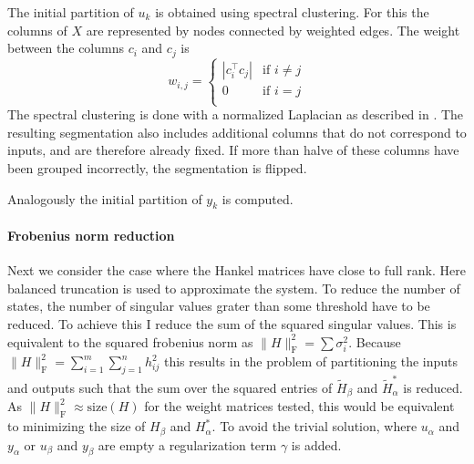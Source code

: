 \documentclass[doctype=mastersthesis,BCOR=15mm,biblatex]{ldvbook}%
\begin{document}
The initial partition of $u_k$ is obtained using spectral clustering.
For this the columns of $X$ are represented by nodes connected by weighted edges.
The weight between the columns $c_i$ and $c_j$ is  
\begin{equation}
	w_{i,j}=
	\begin{cases}
	|c_i^\top c_j| & \text{if } i\neq j\\
	0  & \text{if } i=j\\
	\end{cases}
\end{equation}
The spectral clustering is done with a normalized Laplacian as described in \cite{higham_spectral_2007}.
The resulting segmentation also includes additional columns that do not correspond to inputs, and are therefore already fixed.
If more than halve of these columns have been grouped incorrectly, the segmentation is flipped.

Analogously the initial partition of $y_k$ is computed.


\paragraph{Frobenius norm reduction}
Next we consider the case where the Hankel matrices have close to full rank.
Here balanced truncation is used to approximate the system.
To reduce the number of states, the number of singular values grater than some threshold have to be reduced.
To achieve this I reduce the sum of the squared singular values.
This is equivalent to the squared frobenius norm as $\|H\|_\text{F}^2 = \sum \sigma_i^2$. 
Because $\|H\|_\text{F}^2 = \sum_{i=1}^{m}\sum_{j=1}^{n} h_{ij}^2$ this results in the problem of partitioning the inputs and outputs such that the sum over the squared entries of $\tilde{H}_\beta$ and $\tilde{H}_\alpha^*$ is reduced.
As $\|H\|_\text{F}^2 \approx \text{size}(H)$ for the weight matrices tested, this would be equivalent to minimizing the size of $H_\beta$ and $H_\alpha^*$.
To avoid the trivial solution, where $u_\alpha$ and $y_\alpha$ or $u_\beta$  and $y_\beta$ are empty a regularization term $\gamma$ is added.
\end{document}
